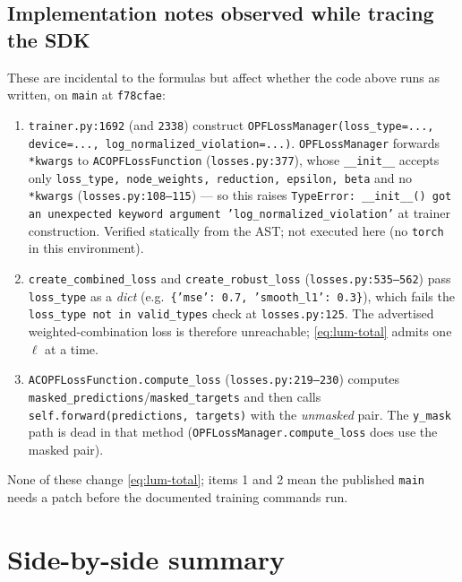 \documentclass[11pt]{article}
\newcommand{\code}[1]{\texttt{\small #1}}
\begin{document}
\subsection{Implementation notes observed while tracing the SDK}

These are incidental to the formulas but affect whether the code above runs as written, on
\code{main} at \code{f78cfae}:
\begin{enumerate}
\item \code{trainer.py:1692} (and \code{2338}) construct
      \code{OPFLossManager(loss\_type=..., device=..., log\_normalized\_violation=...)}.
      \code{OPFLossManager} forwards \code{**kwargs} to \code{ACOPFLossFunction}
      (\code{losses.py:377}), whose \code{\_\_init\_\_} accepts only
      \code{loss\_type, node\_weights, reduction, epsilon, beta} and no \code{**kwargs}
      (\code{losses.py:108--115}) --- so this raises
      \code{TypeError: \_\_init\_\_() got an unexpected keyword argument
      'log\_normalized\_violation'} at trainer construction. Verified statically from the
      AST; not executed here (no \code{torch} in this environment).
\item \code{create\_combined\_loss} and \code{create\_robust\_loss}
      (\code{losses.py:535--562}) pass \code{loss\_type} as a \emph{dict}
      (e.g.\ \code{\{'mse': 0.7, 'smooth\_l1': 0.3\}}), which fails the
      \code{loss\_type not in valid\_types} check at \code{losses.py:125}. The advertised
      weighted-combination loss is therefore unreachable; \eqref{eq:lum-total} admits one
      $\ell$ at a time.
\item \code{ACOPFLossFunction.compute\_loss} (\code{losses.py:219--230}) computes
      \code{masked\_predictions}/\code{masked\_targets} and then calls
      \code{self.forward(predictions, targets)} with the \emph{unmasked} pair. The
      \code{y\_mask} path is dead in that method (\code{OPFLossManager.compute\_loss}
      does use the masked pair).
\end{enumerate}
None of these change \eqref{eq:lum-total}; items 1 and 2 mean the published
\code{main} needs a patch before the documented training commands run.

\section{Side-by-side summary}
\end{document}
